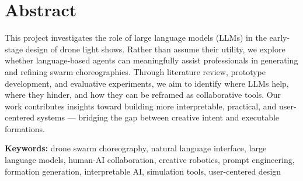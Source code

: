 \newpage
{}
\setcounter{page}{1}
\section{Abstract}
\noindent
This project investigates the role of large language models (LLMs) in the early-stage design of drone light shows. Rather than assume their utility, we explore whether language-based agents can meaningfully assist professionals in generating and refining swarm choreographies. Through literature review, prototype development, and evaluative experiments, we aim to identify where LLMs help, where they hinder, and how they can be reframed as collaborative tools. Our work contributes insights toward building more interpretable, practical, and user-centered systems — bridging the gap between creative intent and executable formations.

\vspace{1in}
\noindent \textbf{Keywords:} drone swarm choreography, natural language interface, large language models, human-AI collaboration, creative robotics, prompt engineering, formation generation, interpretable AI, simulation tools, user-centered design
